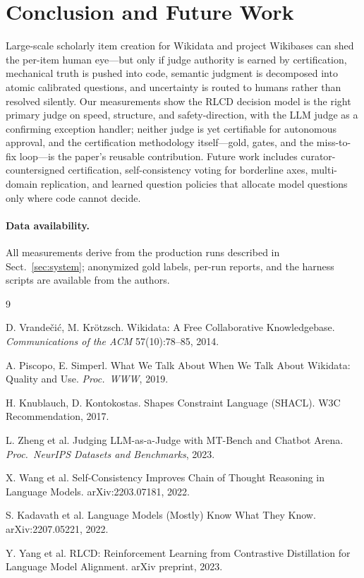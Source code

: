 \documentclass{llncs}
\begin{document}
\section{Conclusion and Future Work}

Large-scale scholarly item creation for Wikidata and project Wikibases can
shed the per-item human eye---but only if judge authority is earned by
certification, mechanical truth is pushed into code, semantic judgment is
decomposed into atomic calibrated questions, and uncertainty is routed to
humans rather than resolved silently. Our measurements show the RLCD
decision model is the right primary judge on speed, structure, and
safety-direction, with the LLM judge as a confirming exception handler;
neither judge is yet certifiable for autonomous approval, and the
certification methodology itself---gold, gates, and the miss-to-fix
loop---is the paper's reusable contribution. Future work includes
curator-countersigned certification, self-consistency voting for
borderline axes, multi-domain replication, and learned question policies
that allocate model questions only where code cannot decide.

\paragraph{Data availability.}
All measurements derive from the production runs described in
Sect.~\ref{sec:system}; anonymized gold labels, per-run reports, and the
harness scripts are available from the authors.

\begin{thebibliography}{9}

D. Vrande\v{c}i\'c, M. Kr\"otzsch.
Wikidata: A Free Collaborative Knowledgebase.
\emph{Communications of the ACM} 57(10):78--85, 2014.

A. Piscopo, E. Simperl.
What We Talk About When We Talk About Wikidata: Quality and Use.
\emph{Proc.\ WWW}, 2019.

H. Knublauch, D. Kontokostas.
Shapes Constraint Language (SHACL).
W3C Recommendation, 2017.

L. Zheng et al.
Judging LLM-as-a-Judge with MT-Bench and Chatbot Arena.
\emph{Proc.\ NeurIPS Datasets and Benchmarks}, 2023.

X. Wang et al.
Self-Consistency Improves Chain of Thought Reasoning in Language Models.
arXiv:2203.07181, 2022.

S. Kadavath et al.
Language Models (Mostly) Know What They Know.
arXiv:2207.05221, 2022.

Y. Yang et al.
RLCD: Reinforcement Learning from Contrastive Distillation for Language
Model Alignment.
arXiv preprint, 2023.

\end{thebibliography}
\end{document}
